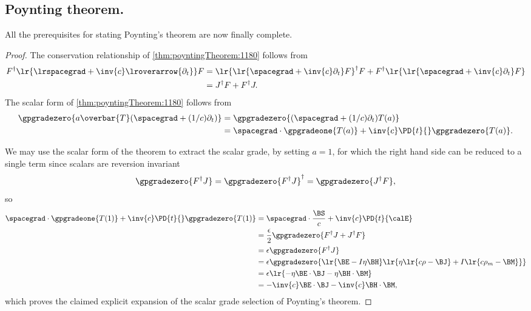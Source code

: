 \subsection{Poynting theorem.}
All the prerequisites for stating Poynting's theorem are now finally complete.

\begin{proof}
The conservation relationship of \cref{thm:poyntingTheorem:1180} follows from
\begin{equation}\label{eqn:poyntingTheoremRewrite:1340}
\begin{aligned}
F^\dagger \lr{ \lrspacegrad + \inv{c}\lroverarrow{\partial_t} } F
&= \lr{ \lr{ \spacegrad + \inv{c} \partial_t } F }^\dagger F + F^\dagger \lr{ \lr{ \spacegrad + \inv{c} \partial_t } F } \\
&= J^\dagger F + F^\dagger J.
\end{aligned}
\end{equation}
The scalar form of
\cref{thm:poyntingTheorem:1180}
follows from
\begin{equation}\label{eqn:poyntingTheoremRewrite:1360}
\begin{aligned}
\gpgradezero{ a \overbar{T}(\spacegrad + (1/c) \partial_t) }
&= \gpgradezero{ (\spacegrad + (1/c) \partial_t) T(a) } \\
&= \spacegrad \cdot \gpgradeone{ T(a) } + \inv{c} \PD{t}{} \gpgradezero{ T(a) }.
\end{aligned}
\end{equation}

We may use the scalar form of the theorem to extract the scalar grade, by setting \( a = 1 \), for which the right hand side
can be reduced to a single term
since scalars are reversion invariant
\begin{equation}\label{eqn:poyntingTheoremRewrite:1000}
\gpgradezero{ F^\dagger J }
=
\gpgradezero{ F^\dagger J }^\dagger
=
\gpgradezero{ J^\dagger F },
\end{equation}
so
\begin{equation}\label{eqn:poyntingTheoremRewrite:960}
\begin{aligned}
\spacegrad \cdot \gpgradeone{ T(1) } + \inv{c} \PD{t}{} \gpgradezero{ T(1) }
&= \spacegrad \cdot \frac{\BS}{c} + \inv{c} \PD{t}{\calE} \\
&= \frac{\epsilon}{2} \gpgradezero{ F^\dagger J + J^\dagger F } \\
&= \epsilon \gpgradezero{ F^\dagger J } \\
&= \epsilon
   \gpgradezero{
      \lr{ \BE -I \eta \BH }\lr{
         \eta \lr{ c \rho - \BJ } + I \lr{ c \rho_m - \BM }
      }
   } \\
&= \epsilon \lr{ -\eta \BE \cdot \BJ -\eta \BH \cdot \BM } \\
&= - \inv{c} \BE \cdot \BJ - \inv{c} \BH \cdot \BM,
\end{aligned}
\end{equation}
which proves the claimed explicit expansion of the scalar grade selection of Poynting's theorem.


\end{proof}
